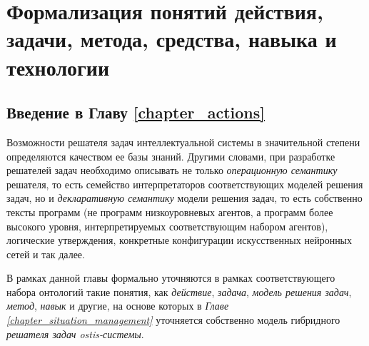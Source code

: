 \chapter{Формализация понятий действия, задачи, метода, средства, навыка и технологии}
\label{chapter_actions}

\vspace{-7\baselineskip}

\begin{SCn}
	

\end{SCn}

\section*{Введение в Главу \ref{chapter_actions}}
Возможности решателя задач интеллектуальной системы в значительной степени определяются качеством ее базы знаний. Другими словами, при разработке решателей задач необходимо описывать не только \textit{операционную семантику} решателя, то есть семейство интерпретаторов соответствующих моделей решения задач, но и \textit{декларативную семантику} модели решения задач, то есть собственно тексты программ (не программ низкоуровневых агентов, а программ более высокого уровня, интерпретируемых соответствующим набором агентов), логические утверждения, конкретные конфигурации искусственных нейронных сетей и так далее.

В рамках данной главы формально уточняются в рамках соответствующего набора онтологий такие понятия, как \textit{действие}, \textit{задача}, \textit{модель решения задач}, \textit{метод}, \textit{навык} и другие, на основе которых в \textit{Главе \ref{chapter_situation_management} } уточняется собственно модель гибридного \textit{решателя задач ostis-системы}.

